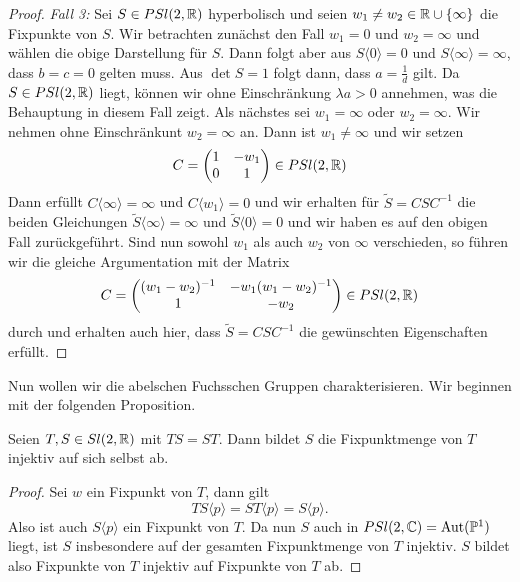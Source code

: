 \begin{proof}
  \emph{Fall 3:} Sei $S \in PSl(2, \mathbb{R})$ hyperbolisch und seien $w_1
  \neq w_2 \in \mathbb{R} \cup \{\infty\}$ die Fixpunkte von $S$. Wir
  betrachten zunächst den Fall $w_1 = 0$ und $w_2 = \infty$ und wählen
  die obige Darstellung für $S$. Dann folgt aber aus $S\langle 0
  \rangle = 0$ und $S\langle \infty \rangle = \infty$, dass $b = c = 0$
  gelten muss. Aus $\det S = 1$ folgt dann, dass $a = \frac{1}{d}$
  gilt. Da $S \in PSl(2,\mathbb{R})$ liegt, können wir ohne Einschränkung
  $\lambda a > 0$ annehmen, was die Behauptung in diesem Fall
  zeigt. Als nächstes sei $w_1 = \infty$ oder $w_2 = \infty$. Wir
  nehmen ohne Einschränkunt $w_2 = \infty$ an. Dann ist $w_1 \neq
  \infty$ und wir setzen
  \[
  C =
  \begin{pmatrix}
    1 & - w_1\\
    0 & 1
  \end{pmatrix}
  \in PSl(2, \mathbb{R})
  \]
  Dann erfüllt $C\langle \infty \rangle = \infty$ und $C\langle w_1
  \rangle = 0$ und wir erhalten für $\tilde S = C S C^{-1}$ die beiden
  Gleichungen $\tilde S \langle \infty \rangle = \infty$ und $\tilde S
  \langle 0 \rangle = 0$ und wir haben es auf den obigen Fall
  zurückgeführt. Sind nun sowohl $w_1$ als auch $w_2$ von $\infty$
  verschieden, so führen wir die gleiche Argumentation mit der Matrix
  \[
  C =
  \begin{pmatrix}
    (w_1 - w_2)^{-1} & - w_1(w_1-w_2)^{-1}\\
    1 & -w_2
  \end{pmatrix}
  \in PSl(2, \mathbb{R})
  \]
  durch und erhalten auch hier, dass $\tilde S = C S C^{-1}$ die
  gewünschten Eigenschaften erfüllt.
\end{proof}

Nun wollen wir die abelschen Fuchsschen Gruppen charakterisieren. Wir
beginnen mit der folgenden Proposition.

\begin{prop}
  \label{prop:komm-fix}
  Seien $T, S \in Sl(2, \mathbb{R})$ mit $TS = ST$. Dann bildet $S$ die
  Fixpunktmenge von $T$ injektiv auf sich selbst ab.
\end{prop}

\begin{proof}
  Sei $w$ ein Fixpunkt von $T$, dann gilt
  \[
  TS \langle p \rangle = ST\langle p \rangle = S\langle p \rangle.
  \]
  Also ist auch $S\langle p \rangle$ ein Fixpunkt von $T$. Da nun $S$
  auch in $PSl(2, \mathbb{C}) = \operatorname{Aut}(\mathbb{P}^1)$ liegt, ist $S$ insbesondere auf
  der gesamten Fixpunktmenge von $T$ injektiv. $S$ bildet also
  Fixpunkte von $T$ injektiv auf Fixpunkte von $T$ ab.
\end{proof}


